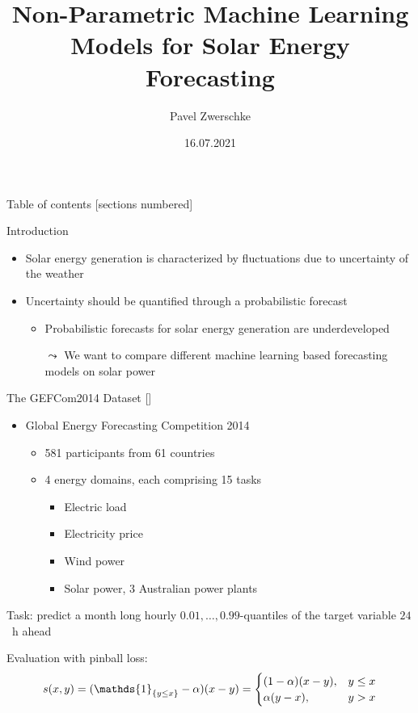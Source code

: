 \documentclass[10pt,aspectratio=169]{beamer}
\title{Non-Parametric Machine Learning Models for Solar Energy Forecasting}
\date{16.07.2021}
\author{Pavel Zwerschke}
\institute{Karlsruhe Institute of Technology}
\begin{document}
\maketitle

\begin{frame}{Table of contents}
    [sections numbered]
    \tableofcontents%
\end{frame}

\begin{frame}{Introduction}
    \begin{itemize}
        \item Solar energy generation is characterized by fluctuations due to uncertainty of the weather
        \item Uncertainty should be quantified through a probabilistic forecast
        \begin{itemize}
            \item Probabilistic forecasts for solar energy generation are underdeveloped
            \item[\(\leadsto\)] We want to compare different machine learning based forecasting models on solar power
        \end{itemize}
    \end{itemize}
\end{frame}

\begin{frame}{The GEFCom2014 Dataset [\cite{Hong2016}]}
    \begin{itemize}
        \item Global Energy Forecasting Competition 2014
        \begin{itemize}
            \item 581 participants from 61 countries
            \item 4 energy domains, each comprising 15 tasks
            \begin{itemize}
                \item Electric load
                \item Electricity price
                \item Wind power
                \item Solar power, 3 Australian power plants
            \end{itemize}
        \end{itemize}
    \end{itemize}
    Task: predict a month long hourly \(0.01, \ldots, 0.99\)-quantiles of the target variable 
    \(24\)~h ahead

    Evaluation with pinball loss: 
    \[ s(x,y) = (\mathds{1}_{\set{y\leq x}} - \alpha)(x - y) = \begin{cases}
        (1-\alpha) (x-y), &y\leq x \\
        \alpha (y - x), & y > x
    \end{cases} \]
\end{frame}
\end{document}
